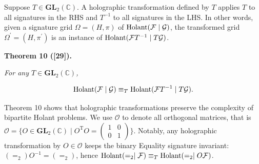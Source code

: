 \documentclass[10pt,a4paper]{article}
\begin{document}
Suppose $T\in\textbf{GL}_{2}(\mathbb{C})$. A holographic transformation defined by $T$ applies $T$ to all signatures in the RHS and $T^{-1}$ to all signatures in the LHS. In other words, given a signature grid $\Omega=(H,\pi)$ of $\textup{{Holant}}(\mathcal{F}\mid\mathcal{G})$, the transformed grid $\Omega^{\prime}=(H,\pi^{\prime})$ is an instance of $\textup{{Holant}}(\mathcal{F}T^{-1}\mid T\mathcal{G})$.\par





\par\medskip\noindent\textbf{
\textbf{Theorem 10}\textbf{ }([29])\textbf{.}
}\par



\emph{For any $T\in\mathbf{GL}_{2}(\mathbb{C})$,}\par


\[\begin{gathered}
\textup{{Holant}}(\mathcal{F}\mid\mathcal{G})\equiv_{T}\textup{{Holant}}(\mathcal{F}T^{-1}\mid T\mathcal{G}).
\end{gathered}\]






Theorem 10 shows that holographic transformations preserve the complexity of bipartite Holant problems. We use $\mathscr{O}$ to denote all orthogonal matrices, that is $\mathscr{O}=\{O\in\textbf{GL}_{2}(\mathbb{C})\mid O^{\mathrm{T}}O=\begin{pmatrix}1&0\\
0&1\end{pmatrix}\}.$ Notably, any holographic transformation by $O\in\mathscr{O}$ keeps the binary Equality signature invariant: $(=_{2})O^{-1}=(=_{2})$, hence $\textup{{Holant}}(=_{2}\mid\mathcal{F})\equiv_{T}\textup{{Holant}}(=_{2}\mid O\mathcal{F})$.\par
\end{document}
